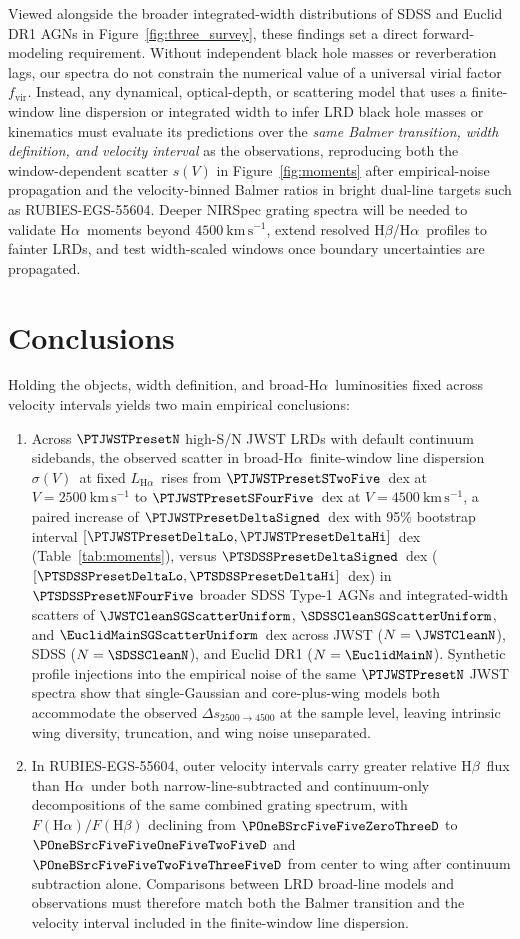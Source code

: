 \documentclass[twocolumn]{aastex631}
\newcommand{\Ha}{\ensuremath{\mathrm{H}\alpha}}
\newcommand{\Hb}{\ensuremath{\mathrm{H}\beta}}
\newcommand{\kms}{\ensuremath{\mathrm{km\,s^{-1}}}}
\newcommand{\LHa}{\ensuremath{L_{\mathrm{H}\alpha}}}
\newcommand{\fvir}{\ensuremath{f_{\mathrm{vir}}}}
\newcommand{\sigV}{\ensuremath{\sigma(V)}}
\begin{document}
Viewed alongside the broader integrated-width distributions of SDSS and Euclid DR1 AGNs in Figure~\ref{fig:three_survey}, these findings set a direct forward-modeling requirement. Without independent black hole masses or reverberation lags, our spectra do not constrain the numerical value of a universal virial factor \fvir. Instead, any dynamical, optical-depth, or scattering model that uses a finite-window line dispersion or integrated width to infer LRD black hole masses or kinematics must evaluate its predictions over the \emph{same Balmer transition, width definition, and velocity interval} as the observations, reproducing both the window-dependent scatter $s(V)$ in Figure~\ref{fig:moments} after empirical-noise propagation and the velocity-binned Balmer ratios in bright dual-line targets such as RUBIES-EGS-55604. Deeper NIRSpec grating spectra will be needed to validate \Ha\ moments beyond $4500~\kms$, extend resolved \Hb/\Ha\ profiles to fainter LRDs, and test width-scaled windows once boundary uncertainties are propagated.

\section{Conclusions}
\label{sec:conclusions}

Holding the objects, width definition, and broad-\Ha\ luminosities fixed across velocity intervals yields two main empirical conclusions:
\begin{enumerate}
\item Across $\PTJWSTPresetN$ high-S/N JWST LRDs with default continuum sidebands, the observed scatter in broad-\Ha\ finite-window line dispersion \sigV\ at fixed \LHa\ rises from $\PTJWSTPresetSTwoFive$~dex at $V = 2500~\kms$ to $\PTJWSTPresetSFourFive$~dex at $V = 4500~\kms$, a paired increase of $\PTJWSTPresetDeltaSigned$~dex with 95\% bootstrap interval $[\PTJWSTPresetDeltaLo, \PTJWSTPresetDeltaHi]$~dex (Table~\ref{tab:moments}), versus $\PTSDSSPresetDeltaSigned$~dex ($[\PTSDSSPresetDeltaLo, \PTSDSSPresetDeltaHi]$~dex) in $\PTSDSSPresetNFourFive$ broader SDSS Type-1 AGNs and integrated-width scatters of $\JWSTCleanSGScatterUniform$, $\SDSSCleanSGScatterUniform$, and $\EuclidMainSGScatterUniform$~dex across JWST ($N = \JWSTCleanN$), SDSS ($N = \SDSSCleanN$), and Euclid DR1 ($N = \EuclidMainN$). Synthetic profile injections into the empirical noise of the same $\PTJWSTPresetN$ JWST spectra show that single-Gaussian and core-plus-wing models both accommodate the observed $\Delta s_{2500\to 4500}$ at the sample level, leaving intrinsic wing diversity, truncation, and wing noise unseparated.
\item In RUBIES-EGS-55604, outer velocity intervals carry greater relative \Hb\ flux than \Ha\ under both narrow-line-subtracted and continuum-only decompositions of the same combined grating spectrum, with $F(\Ha)/F(\Hb)$ declining from $\POneBSrcFiveFiveZeroThreeD$ to $\POneBSrcFiveFiveOneFiveTwoFiveD$ and $\POneBSrcFiveFiveTwoFiveThreeFiveD$ from center to wing after continuum subtraction alone. Comparisons between LRD broad-line models and observations must therefore match both the Balmer transition and the velocity interval included in the finite-window line dispersion.
\end{enumerate}
\end{document}
